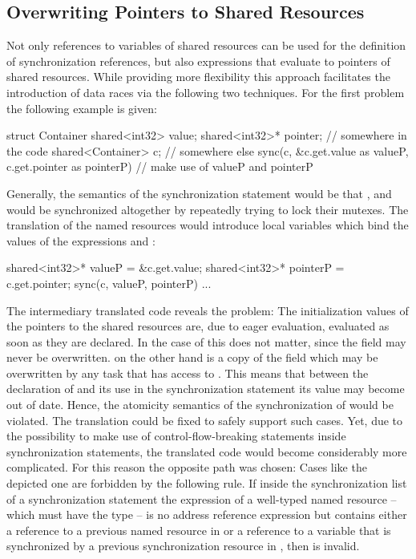 \subsection{Overwriting Pointers to Shared Resources}
Not only references to variables of shared resources can be used for the definition of synchronization references, but also expressions that evaluate to pointers of shared resources. While providing more flexibility this approach facilitates the introduction of data races via the following two techniques. For the first problem the following example is given:
\begin{ccode}
struct Container {
  shared<int32> value;
  shared<int32>* pointer;
}
// somewhere in the code
shared<Container> c;
// somewhere else
sync(c, &c.get.value as valueP, c.get.pointer as pointerP) {
  // make use of valueP and pointerP
}
\end{ccode}
Generally, the semantics of the synchronization statement would be that ,  and  would be synchronized altogether by repeatedly trying to lock their mutexes. The translation of the named resources would introduce local variables which bind the values of the expressions  and :
\begin{ccode}
shared<int32>* valueP = &c.get.value;
shared<int32>* pointerP = c.get.pointer;
sync(c, valueP, pointerP) {...}
\end{ccode}
The intermediary translated code reveals the problem: The initialization values of the pointers to the shared resources are, due to eager evaluation, evaluated as soon as they are declared. In the case of  this does not matter, since the  field may never be overwritten.  on the other hand is a copy of the field  which may be overwritten by any task that has access to . This means that between the declaration of  and its use in the synchronization statement its value may become out of date. Hence, the atomicity semantics of the synchronization of  would be violated. The translation could be fixed to safely support such cases. Yet, due to the possibility to make use of control-flow-breaking statements inside synchronization statements, the translated code would become considerably more complicated. For this reason the opposite path was chosen: Cases like the depicted one are forbidden by the following rule. If inside the synchronization list  of a synchronization statement the expression of a well-typed named resource  -- which must have the type  -- is no address reference expression  but contains either a reference to a previous named resource in  or a reference to a variable that is synchronized by a previous synchronization resource in , then  is invalid.

